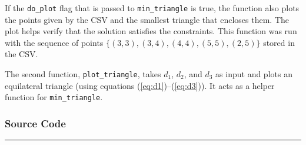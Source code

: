 \documentclass{article}
\begin{document}
\noindent If the \texttt{do\_plot} flag that is passed to \texttt{min\_triangle} is true, the function also plots the points given by the CSV and the smallest triangle that encloses them.
The plot helps verify that the solution satisfies the constraints.
This function was run with the sequence of points $\{(3,3), (3,4), (4,4), (5,5), (2,5)\}$ stored in the CSV.

The second function, \texttt{plot\_triangle}, takes $d_1$, $d_2$, and $d_3$ as input and plots an equilateral triangle (using equations (\ref{eq:d1})--(\ref{eq:d3})).
It acts as a helper function for \texttt{min\_triangle}.

\subsubsection{Source Code}
\vspace{0.25in}
\hrule
\end{document}
